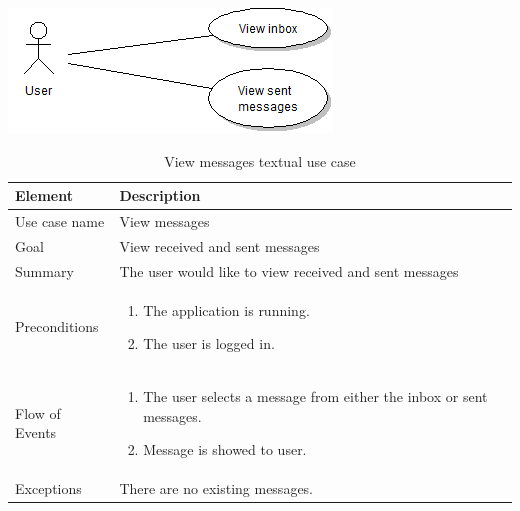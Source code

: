 \begin{table}
\begin{center}
\begin{center}
\includegraphics[width=\textwidth]{view_messages}
\end{center}
\begin{tabular}{p{3cm}|p{12cm}}\hline
\textbf{Element} & \textbf{Description} \\ \hline \hline
Use case name & View messages \\
Goal & View received and sent messages \\
Summary &The user would like to view received and sent messages \\
Preconditions &
\begin{enumerate}
\item{}The application is running.
\item{}The user is logged in.
\end{enumerate} \\ \hline
Flow of Events &
\begin{enumerate}
\item{}The user selects a message from either the inbox or sent messages.
\item{}Message is showed to user.
\end{enumerate} \\ \hline
Exceptions & There are no existing messages.\\ \hline
\end{tabular}
\end{center}
\caption{View messages textual use case} \label{tab:viewmessages}
\end{table}

